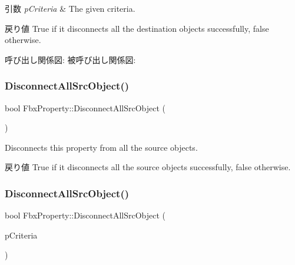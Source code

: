 \begin{DoxyParams}{引数}
{\em p\+Criteria} & The given criteria. \\
\hline
\end{DoxyParams}
\begin{DoxyReturn}{戻り値}
{\ttfamily True} if it disconnects all the destination objects successfully, {\ttfamily false} otherwise. 
\end{DoxyReturn}
呼び出し関係図\+:
被呼び出し関係図\+:
\mbox{\label{class_fbx_property_a7b9a767f964e705be7436739c5752644}} 
\subsubsection{\texorpdfstring{Disconnect\+All\+Src\+Object()}{DisconnectAllSrcObject()}\hspace{0.1cm}{\footnotesize\ttfamily [1/4]}}
{\footnotesize\ttfamily bool Fbx\+Property\+::\+Disconnect\+All\+Src\+Object (\begin{DoxyParamCaption}{ }\end{DoxyParamCaption})}

Disconnects this property from all the source objects. \begin{DoxyReturn}{戻り値}
{\ttfamily True} if it disconnects all the source objects successfully, {\ttfamily false} otherwise. 
\end{DoxyReturn}
\mbox{\label{class_fbx_property_a5535e9be6a48d8fd8fcb3a382067be8d}} 
\subsubsection{\texorpdfstring{Disconnect\+All\+Src\+Object()}{DisconnectAllSrcObject()}\hspace{0.1cm}{\footnotesize\ttfamily [2/4]}}
{\footnotesize\ttfamily bool Fbx\+Property\+::\+Disconnect\+All\+Src\+Object (\begin{DoxyParamCaption}\item[{const \hyperlink{class_fbx_criteria}{Fbx\+Criteria} \&}]{p\+Criteria }\end{DoxyParamCaption})}

